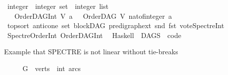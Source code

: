 \begin{isabellebody}
\ integer\ {\isasymRightarrow}\ {\isacharparenleft}{\kern0pt}integer\ set\ {\isasymtimes}\ integer\ list{\isacharparenright}{\kern0pt}{\isachardoublequoteclose}\ \isanewline
\ \ {\isachardoublequoteopen}\ OrderDAG{\isacharunderscore}{\kern0pt}Int\ V\ a\ {\isacharequal}{\kern0pt}\ \ {\isacharparenleft}{\kern0pt}OrderDAG\ V\ {\isacharparenleft}{\kern0pt}nat{\isacharunderscore}{\kern0pt}of{\isacharunderscore}{\kern0pt}integer\ a{\isacharparenright}{\kern0pt}{\isacharparenright}{\kern0pt}{\isachardoublequoteclose}\isanewline
\ \isanewline
\isanewline
{}\isamarkupfalse%
\ top{\isacharunderscore}{\kern0pt}sort\ anticone\ set\ blockDAG\ pre{\isacharunderscore}{\kern0pt}digraph{\isacharunderscore}{\kern0pt}ext\ snd\ fst\ vote{\isacharunderscore}{\kern0pt}Spectre{\isacharunderscore}{\kern0pt}Int\isanewline
\ SpectreOrder{\isacharunderscore}{\kern0pt}Int\ OrderDAG{\isacharunderscore}{\kern0pt}Int\isanewline
\ \ Haskell\ \ DAGS\ \ {\isachardoublequoteopen}code{\isacharslash}{\kern0pt}{\isachardoublequoteclose}%
\isadelimdocument
%
\endisadelimdocument
%
\isatagdocument
%
\isamarkuptrue%
%
\endisatagdocument
{\isafolddocument}%
%
\isadelimdocument
%
\endisadelimdocument
%
\begin{isamarkuptext}%
Example that SPECTRE is not linear without tie-breaks%
\end{isamarkuptext}\isamarkuptrue%
\isamarkupfalse%
\ \isanewline
%
\isadelimproof
\ \ %
\endisadelimproof
%
\isatagproof
{}\isamarkupfalse%
\ {\isacharquery}{\kern0pt}G\ {\isacharequal}{\kern0pt}\ {\isachardoublequoteopen}{\isasymlparr}verts\ {\isacharequal}{\kern0pt}\ {\isacharbraceleft}{\kern0pt}{}{\isacharcolon}{\kern0pt}{\isacharcolon}{\kern0pt}int{\isacharcomma}{\kern0pt}{}{\isacharcomma}{\kern0pt}{}{\isacharcomma}{\kern0pt}{}{\isacharcomma}{\kern0pt}{}{\isacharcomma}{\kern0pt}{}{\isacharcomma}{\kern0pt}{}{\isacharcomma}{\kern0pt}{}{\isacharcomma}{\kern0pt}{}{\isacharcomma}{\kern0pt}{}{}{\isacharbraceright}{\kern0pt}{\isacharcomma}{\kern0pt}\ arcs\ {\isacharequal}{\kern0pt}\ {\isacharbraceleft}{\kern0pt}{\isacharparenleft}{\kern0pt}{}{\isacharcomma}{\kern0pt}{}{\isacharparenright}{\kern0pt}{\isacharcomma}{\kern0pt}{\isacharparenleft}{\kern0pt}{}{\isacharcomma}{\kern0pt}{}{\isacharparenright}{\kern0pt}{\isacharcomma}{\kern0pt}{\isacharparenleft}{\kern0pt}{}{\isacharcomma}{\kern0pt}{}{\isacharparenright}{\kern0pt}{\isacharcomma}{\kern0pt}\isanewline

\end{isabellebody}
